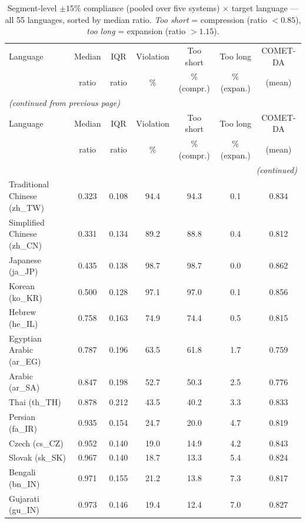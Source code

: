 \begingroup
\scriptsize
\setlength{\tabcolsep}{2pt}
\begin{longtable}{@{}lcccccc@{}}
    \caption{Segment-level $\pm15\%$ compliance (pooled over five systems)
    $\times$ target language --- all 55 languages, sorted by median ratio.
    \emph{Too short} = compression (ratio $<0.85$), \emph{too long} = expansion
    (ratio $>1.15$).}
    \label{tab:appendix-compliance-full} \\
    \toprule
    Language & Median & IQR & Violation & Too short & Too long & COMET-DA \\
     & ratio & ratio & \% & \% (compr.) & \% (expan.) & (mean) \\
    \midrule
    \endfirsthead
    \multicolumn{7}{l}{\textit{(continued from previous page)}} \\
    \toprule
    Language & Median & IQR & Violation & Too short & Too long & COMET-DA \\
     & ratio & ratio & \% & \% (compr.) & \% (expan.) & (mean) \\
    \midrule
    \endhead
    \midrule
    \multicolumn{7}{r}{\textit{(continued)}} \\
    \endfoot
    \bottomrule
    \endlastfoot
    Traditional Chinese (zh\_TW) & 0.323 & 0.108 & 94.4 & 94.3 & 0.1 & 0.834 \\
    Simplified Chinese (zh\_CN) & 0.331 & 0.134 & 89.2 & 88.8 & 0.4 & 0.812 \\
    Japanese (ja\_JP) & 0.435 & 0.138 & 98.7 & 98.7 & 0.0 & 0.862 \\
    Korean (ko\_KR) & 0.500 & 0.128 & 97.1 & 97.0 & 0.1 & 0.856 \\
    Hebrew (he\_IL) & 0.758 & 0.163 & 74.9 & 74.4 & 0.5 & 0.815 \\
    Egyptian Arabic (ar\_EG) & 0.787 & 0.196 & 63.5 & 61.8 & 1.7 & 0.759 \\
    Arabic (ar\_SA) & 0.847 & 0.198 & 52.7 & 50.3 & 2.5 & 0.776 \\
    Thai (th\_TH) & 0.878 & 0.212 & 43.5 & 40.2 & 3.3 & 0.833 \\
    Persian (fa\_IR) & 0.935 & 0.154 & 24.7 & 20.0 & 4.7 & 0.819 \\
    Czech (cs\_CZ) & 0.952 & 0.140 & 19.0 & 14.9 & 4.2 & 0.843 \\
    Slovak (sk\_SK) & 0.967 & 0.140 & 18.7 & 13.3 & 5.4 & 0.824 \\
    Bengali (bn\_IN) & 0.971 & 0.155 & 21.2 & 13.8 & 7.3 & 0.817 \\
    Gujarati (gu\_IN) & 0.973 & 0.146 & 19.4 & 12.4 & 7.0 & 0.827 \\

\end{longtable}
